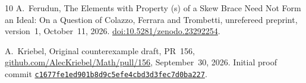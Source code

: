 \documentclass[11pt]{article}
\begin{document}
\begin{thebibliography}{10}
A.~Ferudun, The Elements with Property (s) of a Skew Brace Need Not
Form an Ideal: On a Question of Colazzo, Ferrara and Trombetti,
unrefereed preprint, version~1, October~11, 2026.
\href{https://doi.org/10.5281/zenodo.23292254}
{doi:10.5281/zenodo.23292254}.

A.~Kriebel, Original counterexample draft, PR~156,
\href{https://github.com/AlecKriebel/Math/pull/156}
{github.com/AlecKriebel/Math/pull/156}, September~30, 2026.
Initial proof commit
\href{https://github.com/AlecKriebel/Math/commit/c1677fe1ed901b8d9c5efe4cbd3d3fec7d0ba227}
{\texttt{c1677fe1ed901b8d9c5efe4cbd3d3fec7d0ba227}}.
\end{thebibliography}
\end{document}
